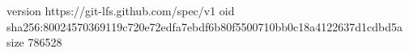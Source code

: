 version https://git-lfs.github.com/spec/v1
oid sha256:80024570369119c720e72edfa7ebdf6b80f5500710bb0c18a4122637d1cdbd5a
size 786528
